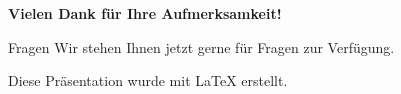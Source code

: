 \documentclass{beamer}
\begin{document}
	
\section*{}
	
	\begin{frame}
		\begin{center}
			\Large\textbf{Vielen Dank für Ihre Aufmerksamkeit!}
		\end{center}
		
		\vspace{0,5cm}
		
		\begin{block}{Fragen}
			Wir stehen Ihnen jetzt gerne für Fragen zur Verfügung.
		\end{block}
		
		\vspace{1cm}
		
		\begin{flushright}
			\footnotesize{Diese Präsentation wurde mit \LaTeX{} erstellt.}
		\end{flushright}
	\end{frame}
	
	
\end{document}
